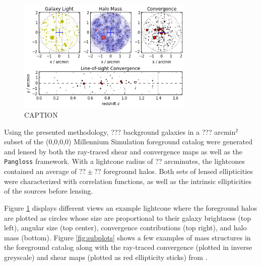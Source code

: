 \documentclass[%
 reprint,
 amsmath,amssymb,
 aps,nofootinbib
]{revtex4-1}
\begin{document}
\begin{figure}
    \centering
    \includegraphics[width=0.75\textwidth]{figs-swe/thesis/lightcone_plots.png}
    \captionsetup{justification=raggedright,singlelinecheck=false}
    \caption{CAPTION}
    \label{fig:lightcone}
\end{figure}

Using the presented methodology, ??? background galaxies in a ??? arcmin$^2$ subset of the (0,0,0,0) Millennium Simulation foreground catalog were generated and lensed by both the ray-traced shear and convergence maps as well as the \texttt{Pangloss} framework. With a lightcone radius of ?? arcminutes, the lightcones contained an average of ${??\pm??}$ foreground halos. Both sets of lensed ellipticities were characterized with correlation functions, as well as the intrinsic ellipticities of the sources before lensing.

Figure \ref{fig:lightcone} displays different views an example lightcone where the foreground halos are plotted as circles whose size are proportional to their galaxy brightness (top left), angular size (top center), convergence contributions (top right), and halo mass (bottom). Figure \ref{fig:subplots} shows a few examples of mass structures in the foreground catalog along with the ray-traced convergence (plotted in inverse greyscale) and shear maps (plotted as red ellipticity sticks) from \cite{ray_tracing}. 
\end{document}
